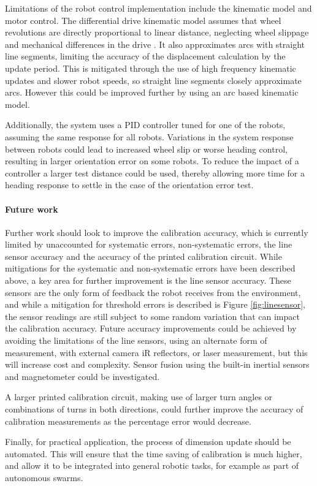 \documentclass[conference]{IEEEtran}
\begin{document}
Limitations of the robot control implementation include the kinematic model and motor control. 
The differential drive kinematic model assumes that wheel revolutions are directly proportional to linear distance, neglecting wheel slippage and mechanical differences in the drive \cite{odometry}. 
It also approximates arcs with straight line segments, limiting the accuracy of the displacement calculation by the update period. This is mitigated through the use of high frequency kinematic updates and slower robot speeds, so straight line segments closely approximate arcs.
However this could be improved further by using an arc based kinematic model.

Additionally, the system uses a PID controller tuned for one of the robots, assuming the same response for all robots.
Variations in the system response between robots could lead to increased wheel slip or worse heading control, resulting in larger orientation error on some robots. 
To reduce the impact of a controller a larger test distance could be used, thereby allowing more time for a heading response to settle in the case of the orientation error test.

\paragraph{Future work}

Further work should look to improve the calibration accuracy, which is currently limited by unaccounted for systematic errors, non-systematic errors, the line sensor accuracy and the accuracy of the printed calibration circuit. 
While mitigations for the systematic and non-systematic errors have been described above, a key area for further improvement is the line sensor accuracy. 
These sensors are the only form of feedback the robot receives from the environment, and while a mitigation for threshold errors is described is Figure \ref{fig:linesensor}, the sensor readings are still subject to some random variation that can impact the calibration accuracy.
Future accuracy improvements could be achieved by avoiding the limitations of the line sensors, using an alternate form of measurement, with external camera iR reflectors, or laser measurement, but this will increase cost and complexity.
Sensor fusion using the built-in inertial sensors and magnetometer could be investigated. 

A larger printed calibration circuit, making use of larger turn angles or combinations of turns in both directions, could further improve the accuracy of calibration measurements as the percentage error would decrease.

Finally, for practical application, the process of dimension update should be automated. This will ensure that the time saving of calibration is much higher, and allow it to be integrated into general robotic tasks, for example as part of autonomous swarms.


 

\end{document}
